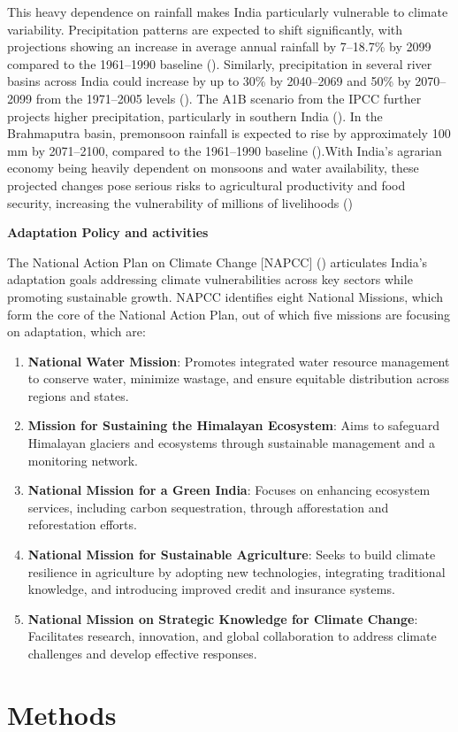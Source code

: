 \documentclass[12pt]{article}
\newcommand{\regularsubsection}[1]{%
  \vspace{1em} %
  \noindent\textbf{#1}\par\vspace{-0.3em}}
\begin{document}
This heavy dependence on rainfall makes India particularly vulnerable to climate variability. Precipitation patterns are expected 
to shift significantly, with projections showing an increase in average annual rainfall by 7–18.7\% by 2099 compared to the 1961–1990 baseline (\cite{chaturvedi_2012}).
Similarly, precipitation in several river basins across India could increase by up to 30\% by 2040–2069 and 50\% by 2070–2099 from the 1971–2005 levels (\cite{mishra_2016}).
The A1B scenario from the IPCC further projects higher precipitation, particularly in southern India (\cite{kim_2009}). In the Brahmaputra basin, premonsoon rainfall is expected 
to rise by approximately 100 mm by 2071–2100, compared to the 1961–1990 baseline (\cite{ghosh_2012}).With India’s agrarian economy being heavily dependent on monsoons and water 
availability, these projected changes pose serious risks to agricultural productivity and food security, increasing the vulnerability of millions of livelihoods (\cite{goyal_2018})



\pagebreak

\regularsubsection{Adaptation Policy and activities}
The National Action Plan on Climate Change [NAPCC] (\cite{napcc_2008}) articulates India's adaptation goals addressing climate 
vulnerabilities across key sectors while promoting sustainable growth. NAPCC identifies eight National Missions, which form 
the core of the National Action Plan, out of which five missions are focusing on adaptation, which are:
\begin{enumerate}
  \item \textbf{National Water Mission}: Promotes integrated water resource management to conserve water, minimize wastage, 
  and ensure equitable distribution across regions and states.  
  \item \textbf{Mission for Sustaining the Himalayan Ecosystem}: Aims to safeguard Himalayan glaciers and ecosystems through 
  sustainable management and a monitoring network.  
  \item \textbf{National Mission for a Green India}: Focuses on enhancing ecosystem services, including carbon sequestration, 
  through afforestation and reforestation efforts.
  \item \textbf{National Mission for Sustainable Agriculture}: Seeks to build climate resilience in agriculture by adopting new 
  technologies, integrating traditional knowledge, and introducing improved credit and insurance systems. 
  \item \textbf{National Mission on Strategic Knowledge for Climate Change}: Facilitates research, innovation, 
  and global collaboration to address climate challenges and develop effective responses.
\end{enumerate}

\section*{Methods}
\end{document}
